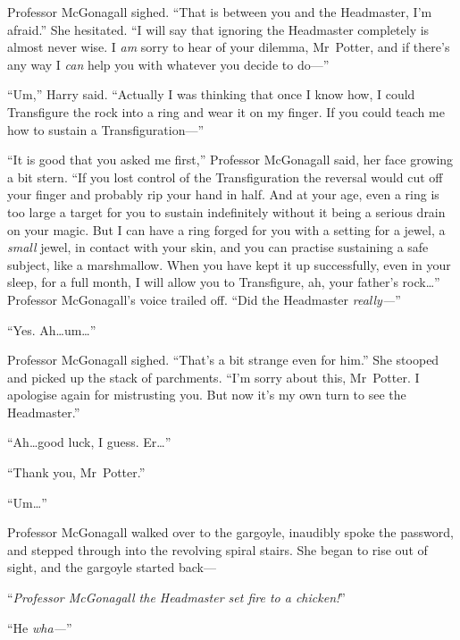 Professor McGonagall sighed. “That is between you and the Headmaster, I’m afraid.” She hesitated. “I will say that ignoring the Headmaster completely is almost never wise. I \emph{am} sorry to hear of your dilemma, Mr~Potter, and if there’s any way I \emph{can} help you with whatever you decide to do—”

“Um,” Harry said. “Actually I was thinking that once I know how, I could Transfigure the rock into a ring and wear it on my finger. If you could teach me how to sustain a Transfiguration—”

“It is good that you asked me first,” Professor McGonagall said, her face growing a bit stern. “If you lost control of the Transfiguration the reversal would cut off your finger and probably rip your hand in half. And at your age, even a ring is too large a target for you to sustain indefinitely without it being a serious drain on your magic. But I can have a ring forged for you with a setting for a jewel, a \emph{small} jewel, in contact with your skin, and you can practise sustaining a safe subject, like a marshmallow. When you have kept it up successfully, even in your sleep, for a full month, I will allow you to Transfigure, ah, your father’s rock…” Professor McGonagall’s voice trailed off. “Did the Headmaster \emph{really—}”

“Yes. Ah…um…”

Professor McGonagall sighed. “That’s a bit strange even for him.” She stooped and picked up the stack of parchments. “I’m sorry about this, Mr~Potter. I apologise again for mistrusting you. But now it’s my own turn to see the Headmaster.”

“Ah…good luck, I guess. Er…”

“Thank you, Mr~Potter.”

“Um…”

Professor McGonagall walked over to the gargoyle, inaudibly spoke the password, and stepped through into the revolving spiral stairs. She began to rise out of sight, and the gargoyle started back—

“\emph{Professor McGonagall the Headmaster set fire to a chicken!}”

“He \emph{wha—}”

